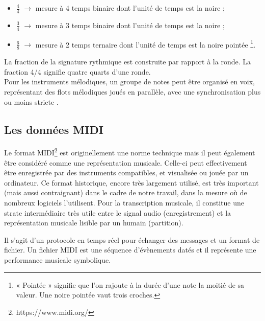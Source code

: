 \begin{itemize}
    \item $\frac{4}{4}$ $\to$ mesure à 4 temps binaire dont l’unité de temps
        est la noire ;\\
    \item $\frac{3}{4}$ $\to$ mesure à 3 temps binaire dont l’unité de temps
        est la noire ;\\
    \item $\frac{6}{8}$ $\to$ mesure à 2 temps ternaire dont l’unité de temps
        est la noire pointée \footnote{« Pointée » signifie que l’on rajoute à
        la durée d’une note la moitié de sa valeur. Une noire pointée vaut
    trois croches.}.\\
\end{itemize}

La fraction de la signature rythmique est construite par rapport à la ronde.
La fraction 4/4 signifie quatre quarts d’une ronde.\\

Pour les instruments mélodiques, un groupe de notes peut être organisé en
voix, représentant des flots mélodiques joués en parallèle, avec une
synchronisation plus ou moins stricte \cite{SHIBATA2021262} \cite{
Guiomard-Kagan}.

\subsection*{Les données MIDI}
Le format MIDI\footnote{https://www.midi.org/} est originellement une norme
technique mais il peut également être considéré comme une représentation
musicale. Celle-ci peut effectivement être enregistrée par des instruments
compatibles, et visualisée ou jouée par un ordinateur. Ce format historique,
encore très largement utilisé, est très important (mais aussi contraignant)
dans le cadre de notre travail, dans la mesure où de nombreux logiciels
l’utilisent. Pour la transcription musicale, il constitue une strate
intermédiaire très utile entre le signal audio (enregistrement) et la
représentation musicale lisible par un humain (partition).

Il s’agit d’un protocole en temps réel pour échanger des messages et un format
de fichier. Un fichier MIDI est une séquence d’évènements datés et il
représente une performance musicale symbolique.

